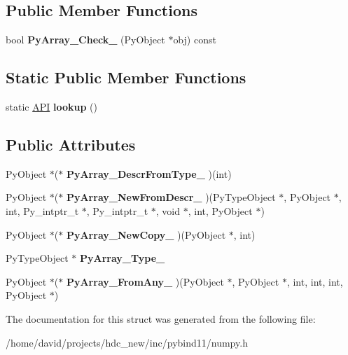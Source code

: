 \subsection*{Public Member Functions}
\begin{DoxyCompactItemize}
\item 
bool {\bfseries Py\+Array\+\_\+\+Check\+\_\+} (Py\+Object $\ast$obj) const \hypertarget{structarray_1_1_a_p_i_a459beeb7f44f701355cae3bae6439f7a}{}\label{structarray_1_1_a_p_i_a459beeb7f44f701355cae3bae6439f7a}

\end{DoxyCompactItemize}
\subsection*{Static Public Member Functions}
\begin{DoxyCompactItemize}
\item 
static \hyperlink{structarray_1_1_a_p_i}{A\+PI} {\bfseries lookup} ()\hypertarget{structarray_1_1_a_p_i_a67fa400bd5769aba900dce322351319d}{}\label{structarray_1_1_a_p_i_a67fa400bd5769aba900dce322351319d}

\end{DoxyCompactItemize}
\subsection*{Public Attributes}
\begin{DoxyCompactItemize}
\item 
Py\+Object $\ast$($\ast$ {\bfseries Py\+Array\+\_\+\+Descr\+From\+Type\+\_\+} )(int)\hypertarget{structarray_1_1_a_p_i_a329fc4d810c3ecfcf85ae12ec7f6dfe3}{}\label{structarray_1_1_a_p_i_a329fc4d810c3ecfcf85ae12ec7f6dfe3}

\item 
Py\+Object $\ast$($\ast$ {\bfseries Py\+Array\+\_\+\+New\+From\+Descr\+\_\+} )(Py\+Type\+Object $\ast$, Py\+Object $\ast$, int, Py\+\_\+intptr\+\_\+t $\ast$, Py\+\_\+intptr\+\_\+t $\ast$, void $\ast$, int, Py\+Object $\ast$)\hypertarget{structarray_1_1_a_p_i_a10972a4bdeac57c1221a5cd3aa08c1ce}{}\label{structarray_1_1_a_p_i_a10972a4bdeac57c1221a5cd3aa08c1ce}

\item 
Py\+Object $\ast$($\ast$ {\bfseries Py\+Array\+\_\+\+New\+Copy\+\_\+} )(Py\+Object $\ast$, int)\hypertarget{structarray_1_1_a_p_i_a9dc299e63dff6c88470b2c2a4d24d57d}{}\label{structarray_1_1_a_p_i_a9dc299e63dff6c88470b2c2a4d24d57d}

\item 
Py\+Type\+Object $\ast$ {\bfseries Py\+Array\+\_\+\+Type\+\_\+}\hypertarget{structarray_1_1_a_p_i_a9acaf2960942a9b82c5dd5f345643fa7}{}\label{structarray_1_1_a_p_i_a9acaf2960942a9b82c5dd5f345643fa7}

\item 
Py\+Object $\ast$($\ast$ {\bfseries Py\+Array\+\_\+\+From\+Any\+\_\+} )(Py\+Object $\ast$, Py\+Object $\ast$, int, int, int, Py\+Object $\ast$)\hypertarget{structarray_1_1_a_p_i_a16fe63282e0c540760abf18b77590ab9}{}\label{structarray_1_1_a_p_i_a16fe63282e0c540760abf18b77590ab9}

\end{DoxyCompactItemize}


The documentation for this struct was generated from the following file\+:\begin{DoxyCompactItemize}
\item 
/home/david/projects/hdc\+\_\+new/inc/pybind11/numpy.\+h\end{DoxyCompactItemize}
